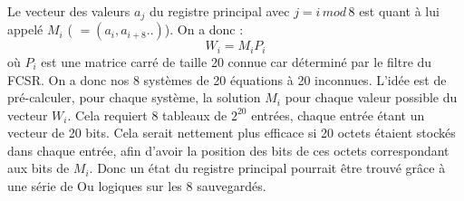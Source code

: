 \documentclass[11pt]{report}
\begin{document}
Le vecteur des valeurs $a_j$  du registre principal avec $j = i \, mod \, 8$ est quant à lui appelé $M_i$ ( $= (a_i,a_{i+8}..)$). On a donc : 
$$
W_i = M_iP_i
$$
où $P_i$ est une matrice carré de taille 20 connue car déterminé par le filtre du FCSR. 
On a donc nos 8 systèmes de 20 équations à 20 inconnues. 
L'idée est de pré-calculer, pour chaque système, la solution $M_i$ pour chaque valeur possible du vecteur $W_i$. Cela requiert 8 tableaux de $2^{20}$ entrées, chaque entrée étant un vecteur de 20 bits. Cela serait nettement plus efficace si 20 octets étaient stockés dans chaque entrée, afin d'avoir la position des bits de ces octets correspondant aux bits de $M_i$. Donc un état du registre principal pourrait être trouvé grâce à une série de Ou logiques sur les 8 sauvegardés. 
\end{document}
